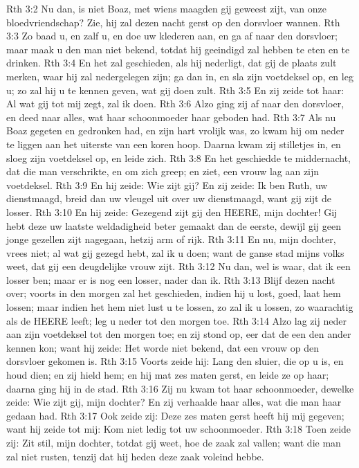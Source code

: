Rth 3:2  Nu dan, is niet Boaz, met wiens maagden gij geweest zijt, van onze bloedvriendschap? Zie, hij zal dezen nacht gerst op den dorsvloer wannen.
Rth 3:3  Zo baad u, en zalf u, en doe uw klederen aan, en ga af naar den dorsvloer; maar maak u den man niet bekend, totdat hij geeindigd zal hebben te eten en te drinken.
Rth 3:4  En het zal geschieden, als hij nederligt, dat gij de plaats zult merken, waar hij zal nedergelegen zijn; ga dan in, en sla zijn voetdeksel op, en leg u; zo zal hij u te kennen geven, wat gij doen zult.
Rth 3:5  En zij zeide tot haar: Al wat gij tot mij zegt, zal ik doen.
Rth 3:6  Alzo ging zij af naar den dorsvloer, en deed naar alles, wat haar schoonmoeder haar geboden had.
Rth 3:7  Als nu Boaz gegeten en gedronken had, en zijn hart vrolijk was, zo kwam hij om neder te liggen aan het uiterste van een koren hoop. Daarna kwam zij stilletjes in, en sloeg zijn voetdeksel op, en leide zich.
Rth 3:8  En het geschiedde te middernacht, dat die man verschrikte, en om zich greep; en ziet, een vrouw lag aan zijn voetdeksel.
Rth 3:9  En hij zeide: Wie zijt gij? En zij zeide: Ik ben Ruth, uw dienstmaagd, breid dan uw vleugel uit over uw dienstmaagd, want gij zijt de losser.
Rth 3:10  En hij zeide: Gezegend zijt gij den HEERE, mijn dochter! Gij hebt deze uw laatste weldadigheid beter gemaakt dan de eerste, dewijl gij geen jonge gezellen zijt nagegaan, hetzij arm of rijk.
Rth 3:11  En nu, mijn dochter, vrees niet; al wat gij gezegd hebt, zal ik u doen; want de ganse stad mijns volks weet, dat gij een deugdelijke vrouw zijt.
Rth 3:12  Nu dan, wel is waar, dat ik een losser ben; maar er is nog een losser, nader dan ik.
Rth 3:13  Blijf dezen nacht over; voorts in den morgen zal het geschieden, indien hij u lost, goed, laat hem lossen; maar indien het hem niet lust u te lossen, zo zal ik u lossen, zo waarachtig als de HEERE leeft; leg u neder tot den morgen toe.
Rth 3:14  Alzo lag zij neder aan zijn voetdeksel tot den morgen toe; en zij stond op, eer dat de een den ander kennen kon; want hij zeide: Het worde niet bekend, dat een vrouw op den dorsvloer gekomen is.
Rth 3:15  Voorts zeide hij: Lang den sluier, die op u is, en houd dien; en zij hield hem; en hij mat zes maten gerst, en leide ze op haar; daarna ging hij in de stad.
Rth 3:16  Zij nu kwam tot haar schoonmoeder, dewelke zeide: Wie zijt gij, mijn dochter? En zij verhaalde haar alles, wat die man haar gedaan had.
Rth 3:17  Ook zeide zij: Deze zes maten gerst heeft hij mij gegeven; want hij zeide tot mij: Kom niet ledig tot uw schoonmoeder.
Rth 3:18  Toen zeide zij: Zit stil, mijn dochter, totdat gij weet, hoe de zaak zal vallen; want die man zal niet rusten, tenzij dat hij heden deze zaak voleind hebbe.
